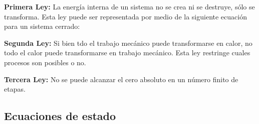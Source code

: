 \textbf{Primera Ley:} La energía interna de un sistema no se crea ni se destruye, sólo se transforma. Esta ley puede ser representada por medio de la siguiente ecuación para un sistema cerrado:


\textbf{Segunda Ley:} Si bien tdo el trabajo mecánico puede transformarse en calor, no todo el calor puede transformarse en trabajo mecánico. Esta ley restringe cuales procesos son posibles o no.

\textbf{Tercera Ley:} No se puede alcanzar el cero absoluto en un número finito de etapas.

\subsection{Ecuaciones de estado}

